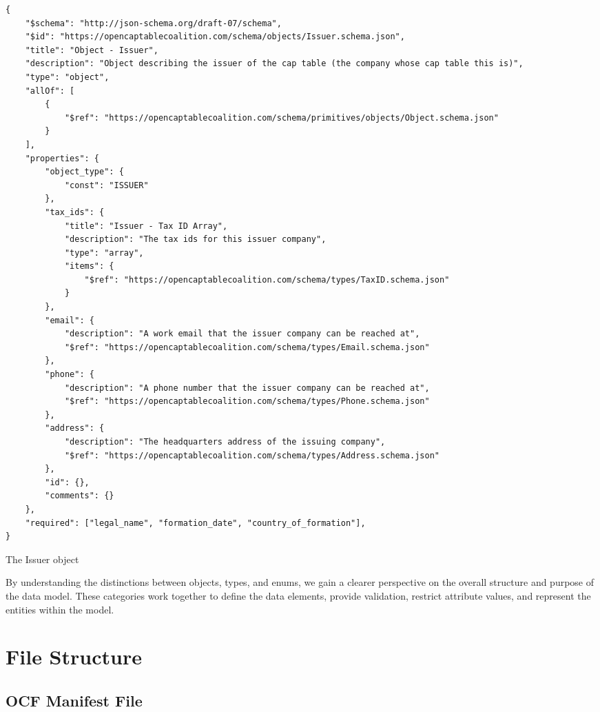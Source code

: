 \begin{listing}[!h]
\begin{verbatim}
{
    "$schema": "http://json-schema.org/draft-07/schema",
    "$id": "https://opencaptablecoalition.com/schema/objects/Issuer.schema.json",
    "title": "Object - Issuer",
    "description": "Object describing the issuer of the cap table (the company whose cap table this is)",
    "type": "object",
    "allOf": [
        {
            "$ref": "https://opencaptablecoalition.com/schema/primitives/objects/Object.schema.json"
        }
    ],
    "properties": {
        "object_type": {
            "const": "ISSUER"
        },
        "tax_ids": {
            "title": "Issuer - Tax ID Array",
            "description": "The tax ids for this issuer company",
            "type": "array",
            "items": {
                "$ref": "https://opencaptablecoalition.com/schema/types/TaxID.schema.json"
            }
        },
        "email": {
            "description": "A work email that the issuer company can be reached at",
            "$ref": "https://opencaptablecoalition.com/schema/types/Email.schema.json"
        },
        "phone": {
            "description": "A phone number that the issuer company can be reached at",
            "$ref": "https://opencaptablecoalition.com/schema/types/Phone.schema.json"
        },
        "address": {
            "description": "The headquarters address of the issuing company",
            "$ref": "https://opencaptablecoalition.com/schema/types/Address.schema.json"
        },
        "id": {},
        "comments": {}
    },
    "required": ["legal_name", "formation_date", "country_of_formation"],
}
\end{verbatim}
\caption{The Issuer object}
\label{lst:issuer-object-json-schema}
\end{listing}


By understanding the distinctions between objects, types, and enums, we gain a clearer perspective on the overall structure and purpose of the data model. These categories work together to define the data elements, provide validation, restrict attribute values, and represent the entities within the model.

\section{File Structure}
\subsection{OCF Manifest File}

